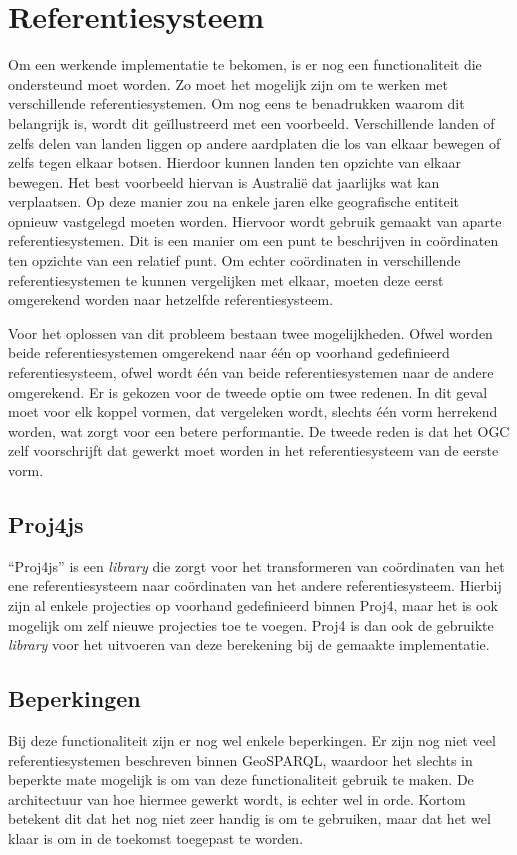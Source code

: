 \section{Referentiesysteem}
\label{sec:projecties}
Om een werkende implementatie te bekomen, is er nog een functionaliteit die ondersteund moet worden. Zo moet het mogelijk zijn om te werken met verschillende referentiesystemen. Om nog eens te benadrukken waarom dit belangrijk is, wordt dit geïllustreerd met een voorbeeld. Verschillende landen of zelfs delen van landen liggen op andere aardplaten die los van elkaar bewegen of zelfs tegen elkaar botsen. Hierdoor kunnen landen ten opzichte van elkaar bewegen. Het best voorbeeld hiervan is Australië dat jaarlijks wat kan verplaatsen. Op deze manier zou na enkele jaren elke geografische entiteit opnieuw vastgelegd moeten worden. Hiervoor wordt gebruik gemaakt van aparte referentiesystemen. Dit is een manier om een punt te beschrijven in coördinaten ten opzichte van een relatief punt. Om echter coördinaten in verschillende referentiesystemen te kunnen vergelijken met elkaar, moeten deze eerst omgerekend worden naar hetzelfde referentiesysteem.

Voor het oplossen van dit probleem bestaan twee mogelijkheden. Ofwel worden beide referentiesystemen omgerekend naar één op voorhand gedefinieerd referentiesysteem, ofwel wordt één van beide referentiesystemen naar de andere omgerekend. Er is gekozen voor de tweede optie om twee redenen. In dit geval moet voor elk koppel vormen, dat vergeleken wordt, slechts één vorm herrekend worden, wat zorgt voor een betere performantie. De tweede reden is dat het OGC zelf voorschrijft dat gewerkt moet worden in het referentiesysteem van de eerste vorm.

\subsection{Proj4js}
``Proj4js'' is een \textit{library} die zorgt voor het transformeren van coördinaten van het ene referentiesysteem naar coördinaten van het andere referentiesysteem. Hierbij zijn al enkele projecties op voorhand gedefinieerd binnen Proj4, maar het is ook mogelijk om zelf nieuwe projecties toe te voegen. Proj4 is dan ook de gebruikte \textit{library} voor het uitvoeren van deze berekening bij de gemaakte implementatie.

\subsection{Beperkingen}
Bij deze functionaliteit zijn er nog wel enkele beperkingen. Er zijn nog niet veel referentiesystemen beschreven binnen GeoSPARQL, waardoor het slechts in beperkte mate mogelijk is om van deze functionaliteit gebruik te maken. De architectuur van hoe hiermee gewerkt wordt, is echter wel in orde. Kortom betekent dit dat het nog niet zeer handig is om te gebruiken, maar dat het wel klaar is om in de toekomst toegepast te worden.